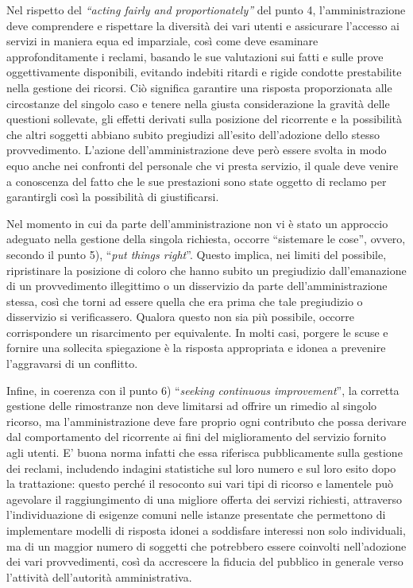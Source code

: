 \documentclass[12pt,it,a4paper,]{report}
\begin{document}
Nel rispetto del \emph{``acting fairly and proportionately''} del punto
4, l'amministrazione deve comprendere e rispettare la diversità dei vari
utenti e assicurare l'accesso ai servizi in maniera equa ed imparziale,
così come deve esaminare approfonditamente i reclami, basando le sue
valutazioni sui fatti e sulle prove oggettivamente disponibili, evitando
indebiti ritardi e rigide condotte prestabilite nella gestione dei
ricorsi. Ciò significa garantire una risposta proporzionata alle
circostanze del singolo caso e tenere nella giusta considerazione la
gravità delle questioni sollevate, gli effetti derivati sulla posizione
del ricorrente e la possibilità che altri soggetti abbiano subito
pregiudizi all'esito dell'adozione dello stesso provvedimento. L'azione
dell'amministrazione deve però essere svolta in modo equo anche nei
confronti del personale che vi presta servizio, il quale deve venire a
conoscenza del fatto che le sue prestazioni sono state oggetto di
reclamo per garantirgli così la possibilità di giustificarsi.

Nel momento in cui da parte dell'amministrazione non vi è stato un
approccio adeguato nella gestione della singola richiesta, occorre
``sistemare le cose'', ovvero, secondo il punto 5), ``\emph{put things
right}''. Questo implica, nei limiti del possibile, ripristinare la
posizione di coloro che hanno subito un pregiudizio dall'emanazione di
un provvedimento illegittimo o un disservizio da parte
dell'amministrazione stessa, così che torni ad essere quella che era
prima che tale pregiudizio o disservizio si verificassero. Qualora
questo non sia più possibile, occorre corrispondere un risarcimento per
equivalente. In molti casi, porgere le scuse e fornire una sollecita
spiegazione è la risposta appropriata e idonea a prevenire l'aggravarsi
di un conflitto.

Infine, in coerenza con il punto 6) ``\emph{seeking continuous
improvement}'', la corretta gestione delle rimostranze non deve
limitarsi ad offrire un rimedio al singolo ricorso, ma l'amministrazione
deve fare proprio ogni contributo che possa derivare dal comportamento
del ricorrente ai fini del miglioramento del servizio fornito agli
utenti. E' buona norma infatti che essa riferisca pubblicamente sulla
gestione dei reclami, includendo indagini statistiche sul loro numero e
sul loro esito dopo la trattazione: questo perché il resoconto sui vari
tipi di ricorso e lamentele può agevolare il raggiungimento di una
migliore offerta dei servizi richiesti, attraverso l'individuazione di
esigenze comuni nelle istanze presentate che permettono di implementare
modelli di risposta idonei a soddisfare interessi non solo individuali,
ma di un maggior numero di soggetti che potrebbero essere coinvolti
nell'adozione dei vari provvedimenti, così da accrescere la fiducia del
pubblico in generale verso l'attività dell'autorità amministrativa.
\end{document}
